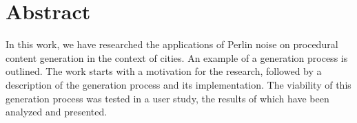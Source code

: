 \section{Abstract}
In this work, we have researched the applications of Perlin noise on procedural content generation in the context of cities. An example of a generation process is outlined. The work starts with a motivation for the research, followed by a description of the generation process and its implementation. The viability of this generation process was tested in a user study, the results of which have been analyzed and presented.